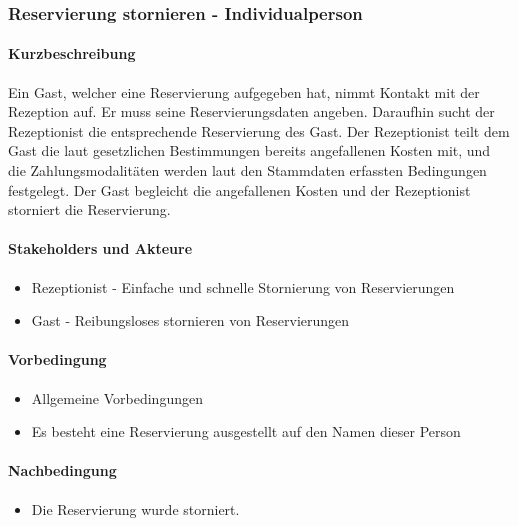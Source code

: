 \subsubsection{Reservierung stornieren - Individualperson}

\paragraph{Kurzbeschreibung}
Ein \Gls{Gast}, welcher eine \Gls{Reservierung} aufgegeben hat, nimmt Kontakt mit der \Gls{Rezeption} auf. Er muss seine Reservierungsdaten angeben. Daraufhin sucht der \Gls{Rezeptionist} die entsprechende \Gls{Reservierung} des \Gls{Gast}. Der \Gls{Rezeptionist} teilt dem \Gls{Gast} die laut gesetzlichen Bestimmungen bereits angefallenen Kosten mit, und die Zahlungsmodalitäten werden laut den \Gls{Stammdaten} erfassten Bedingungen festgelegt. Der \Gls{Gast} begleicht die angefallenen Kosten und der \Gls{Rezeptionist} storniert die \Gls{Reservierung}.

\paragraph{Stakeholders und Akteure}
\begin{itemize}
\item \Gls{Rezeptionist} - Einfache und schnelle Stornierung von Reservierungen
\item \Gls{Gast} - Reibungsloses stornieren von Reservierungen
\end{itemize}

\paragraph{Vorbedingung}
\begin{itemize}
\item Allgemeine Vorbedingungen
\item Es besteht eine \Gls{Reservierung} ausgestellt auf den Namen dieser Person
\end{itemize}

\paragraph{Nachbedingung}
\begin{itemize}
\item Die \Gls{Reservierung} wurde storniert.
\end{itemize}

